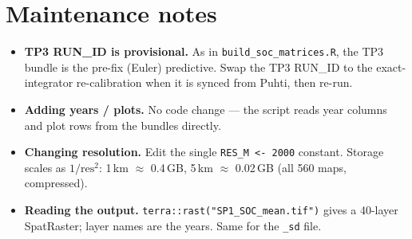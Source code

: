 \documentclass[11pt]{article}
\newcommand{\code}[1]{\texttt{\small #1}}
\begin{document}
\section{Maintenance notes}

\begin{itemize}
\item \textbf{TP3 RUN\_ID is provisional.} As in \code{build\_soc\_matrices.R},
  the TP3 bundle is the pre-fix (Euler) predictive. Swap the TP3 RUN\_ID to the
  exact-integrator re-calibration when it is synced from Puhti, then re-run.
\item \textbf{Adding years / plots.} No code change --- the script reads year
  columns and plot rows from the bundles directly.
\item \textbf{Changing resolution.} Edit the single \code{RES\_M <- 2000}
  constant. Storage scales as $1/\text{res}^2$: 1\,km $\approx$ 0.4\,GB, 5\,km
  $\approx$ 0.02\,GB (all 560 maps, compressed).
\item \textbf{Reading the output.} \code{terra::rast("SP1\_SOC\_mean.tif")} gives
  a 40-layer SpatRaster; layer names are the years. Same for the \code{\_sd} file.
\end{itemize}
\end{document}
